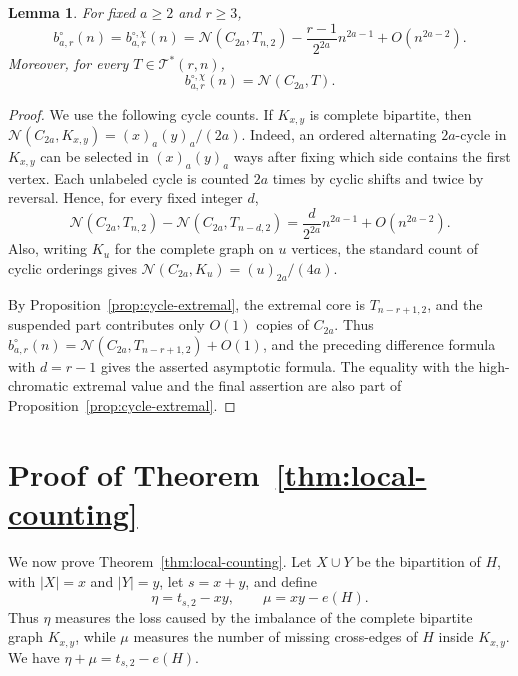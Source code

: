 \documentclass[11pt]{article}
\newtheorem{lemma}[theorem]{Lemma}
\theoremstyle{definition}
\theoremstyle{plain}
\theoremstyle{remark}
\theoremstyle{plain}
\numberwithin{equation}{section}
\newcommand{\cT}{\mathcal T}
\newcommand{\N}{\mathcal N}
\begin{document}
\begin{lemma}\label{lem:cycle-extremal-asymp}
For fixed $a\ge2$ and $r\ge3$,
\[
        b^{\circ}_{a,r}(n)=b^{\circ,\chi}_{a,r}(n)
        =\N(C_{2a},T_{n,2})-\frac{r-1}{2^{2a}}n^{2a-1}+O(n^{2a-2}).
\]
Moreover, for every $T\in \cT^*(r,n)$,
\[
        b^{\circ,\chi}_{a,r}(n)=\N(C_{2a},T).
\]
\end{lemma}

\begin{proof}
We use the following cycle counts. If $K_{x,y}$ is complete bipartite, then $\N(C_{2a},K_{x,y})=(x)_a(y)_a/(2a)$. Indeed, an ordered alternating $2a$-cycle in $K_{x,y}$ can be selected in $(x)_a(y)_a$ ways after fixing which side contains the first vertex. Each unlabeled cycle is counted $2a$ times by cyclic shifts and twice by reversal. Hence, for every fixed integer $d$,
\[
        \N(C_{2a},T_{n,2})-\N(C_{2a},T_{n-d,2})
        =\frac{d}{2^{2a}}n^{2a-1}+O(n^{2a-2}).
\]
Also, writing $K_u$ for the complete graph on $u$ vertices, the standard count of cyclic orderings gives $\N(C_{2a},K_u)=(u)_{2a}/(4a)$.

By Proposition~\ref{prop:cycle-extremal}, the extremal core is $T_{n-r+1,2}$, and the suspended part contributes only $O(1)$ copies of $C_{2a}$. Thus $b^{\circ}_{a,r}(n)=\N(C_{2a},T_{n-r+1,2})+O(1)$, and the preceding difference formula with $d=r-1$ gives the asserted asymptotic formula. The equality with the high-chromatic extremal value and the final assertion are also part of Proposition~\ref{prop:cycle-extremal}.
\end{proof}

\section{\texorpdfstring{Proof of Theorem~\ref{thm:local-counting}}{Proof of the counting theorem}}\label{sec:stability}

We now prove Theorem~\ref{thm:local-counting}. Let $X\cup Y$ be the bipartition of $H$, with $|X|=x$ and $|Y|=y$, let $s=x+y$, and define
\[
        \eta=t_{s,2}-xy,\qquad \mu=xy-e(H).
\]
Thus $\eta$ measures the loss caused by the imbalance of the complete bipartite graph $K_{x,y}$, while $\mu$ measures the number of missing cross-edges of $H$ inside $K_{x,y}$. We have $\eta+\mu=t_{s,2}-e(H)$.
\end{document}
